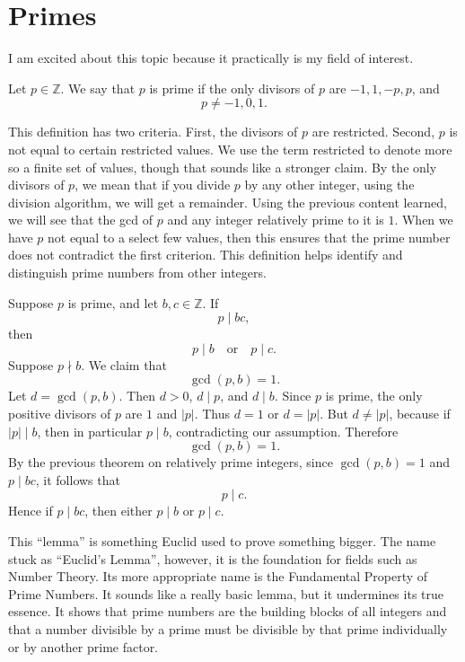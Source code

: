 
\section{Primes}

I am excited about this topic because it practically is my field of interest.

\begin{definition}
    Let $p\in\mathbb{Z}$.
    We say that $p$ is prime if the only divisors of $p$ are $-1,1,-p,p$, and
    \[
        p\neq -1,0,1.
    \]
\end{definition}

This definition has two criteria.
First, the divisors of $p$ are restricted.
Second, $p$ is not equal to certain restricted values.
We use the term restricted to denote more so a finite set of values, though that sounds like a stronger claim.
By the only divisors of $p$, we mean that if you divide $p$ by any other integer, using the division algorithm, we will get a remainder.
Using the previous content learned, we will see that the gcd of $p$ and any integer relatively prime to it is $1$.
When we have $p$ not equal to a select few values, then this ensures that the prime number does not contradict the first criterion.
This definition helps identify and distinguish prime numbers from other integers.

\begin{theorem}{
    Suppose $p$ is prime, and let $b,c\in\mathbb{Z}$.
    If
    \[
        p\mid bc,
    \]
    then
    \[
        p\mid b \quad \text{or} \quad p\mid c.
    \]
}
    Suppose $p\nmid b$.
    We claim that
    \[
        \gcd(p,b)=1.
    \]
    Let $d = \gcd(p,b)$.
    Then $d>0$, $d\mid p$, and $d\mid b$.
    Since $p$ is prime, the only positive divisors of $p$ are $1$ and $|p|$.
    Thus $d=1$ or $d=|p|$.
    But $d\neq |p|$, because if $|p|\mid b$, then in particular $p\mid b$, contradicting our assumption.
    Therefore
    \[
        \gcd(p,b)=1.
    \]
    By the previous theorem on relatively prime integers, since $\gcd(p,b)=1$ and $p\mid bc$, it follows that
    \[
        p\mid c.
    \]
    Hence if $p\mid bc$, then either $p\mid b$ or $p\mid c$.
\end{theorem}

This ``lemma'' is something Euclid used to prove something bigger.
The name stuck as ``Euclid's Lemma'', however, it is the foundation for fields such as Number Theory.
Its more appropriate name is the Fundamental Property of Prime Numbers.
It sounds like a really basic lemma, but it undermines its true essence.
It shows that prime numbers are the building blocks of all integers and that a number divisible by a prime must be divisible by that prime individually or by another prime factor.

